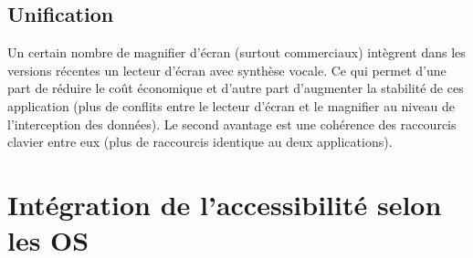 \documentclass[french,a4paper]{report}
\begin{document}
\subsection{Unification}
Un certain nombre de magnifier d'écran (surtout commerciaux) intègrent dans les versions récentes un lecteur d'écran avec synthèse vocale. Ce qui permet d'une part de réduire le coût économique et d'autre part d'augmenter la stabilité de ces application (plus de conflits entre le lecteur d'écran et le magnifier au niveau de l'interception des données). Le second avantage est une cohérence des raccourcis clavier entre eux (plus de raccourcis identique au deux applications).
\section{Intégration de l'accessibilité selon les OS}
\end{document}
